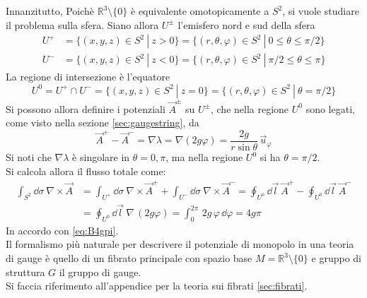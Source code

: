 Innanzitutto, Poichè $\mathbb{R}^3 \setminus \{0\}$ è equivalente omotopicamente
a $S^2$, si vuole studiare il problema sulla sfera. Siano allora $U^\pm$ l'emisfero
nord e sud della sfera
\begin{equation}\label{eq:U+U-}
   \begin{aligned}
      U^+ &= \{(x,y,z) \in S^2 \: | \: z > 0 \}
          = \{(r,\theta,\varphi ) \in S^2 \: | \: 0 \leq \theta \leq \pi/2 \} \\
      U^- &= \{(x,y,z) \in S^2 \: | \: z < 0 \}
          = \{(r,\theta,\varphi ) \in S^2 \: | \: \pi/2 \leq \theta \leq \pi \}
   \end{aligned}
\end{equation}
La regione di intersezione è l'equatore
\begin{equation*}
   U^0 = U^+ \cap U^- = \{(x,y,z) \in S^2 \: | \: z = 0 \}
       = \{(r,\theta,\varphi ) \in S^2 \: | \: \theta = \pi/2 \}
\end{equation*}
Si possono allora definire i potenziali $\vec A^\pm$ su $U^\pm$, che nella regione
$U^0$ sono legati, come visto nella sezione \ref{sec:gaugestring}, da
$$
   \vec A ^+ - \vec A^- = \nabla \lambda = \nabla (2g\varphi ) = \frac{2g}{r\sin\theta} \, \vec u _\varphi
$$
Si noti che $\nabla \lambda$ è singolare in $\theta = 0,\pi$, ma nella regione $U^0$
si ha $\theta = \pi/2$.\\
Si calcola allora il flusso totale come:
\begin{equation*}
   \begin{aligned}
      \int_{S^2} \dd \sigma \: \nabla \times \vec A & =
         \int_{U^+} \dd \sigma \: \nabla \times \vec A^+ +
         \int_{U^-} \dd \sigma \: \nabla \times \vec A^-
        = \oint_{U^0} \dd \vec l \: \vec A^+ -
          \oint_{U^0} \dd \vec l \: \vec A^- \\
      & = \oint_{U^0} \dd \vec l \: \nabla \, (2g\varphi )
        = \int_0^{2\pi} \, 2g \, \varphi  \, \dd \varphi
        = 4g\pi
   \end{aligned}
\end{equation*}
In accordo con \ref{eq:B4gpi}.\\

Il formalismo più naturale per descrivere il potenziale di monopolo in una teoria
di gauge è quello di un fibrato principale con spazio base $M = \mathbb{R}^3
\setminus \{0\}$ e gruppo di struttura $G$ il gruppo di gauge.\\
Si faccia riferimento all'appendice per la teoria sui fibrati \ref{sec:fibrati}.

